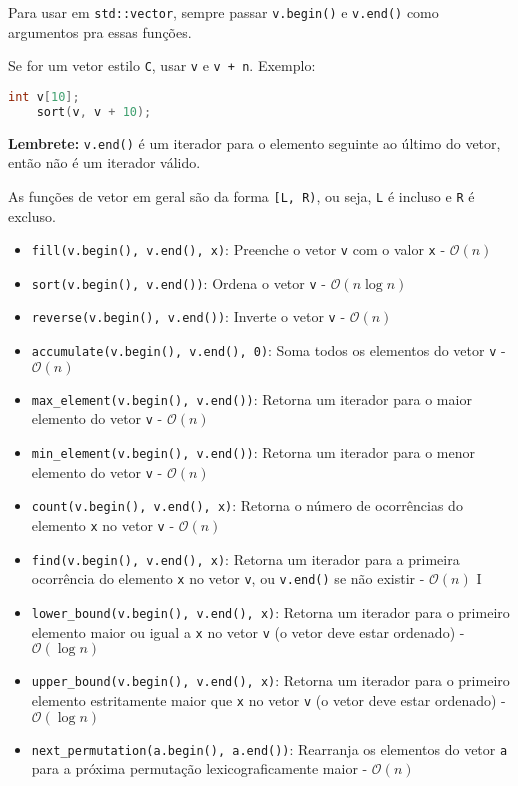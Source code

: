 \documentclass[10pt, a4paper, oneside]{book}
\begin{document}
Para usar em \texttt{std::vector}, sempre passar \texttt{v.begin()} e \texttt{v.end()} como argumentos pra essas funções.

Se for um vetor estilo \texttt{C}, usar \texttt{v} e \texttt{v + n}. 
Exemplo:
\begin{lstlisting}[language=C++]
    int v[10];
    sort(v, v + 10);
\end{lstlisting}

\textbf{Lembrete:} \texttt{v.end()} é um iterador para o elemento seguinte ao último do vetor, então não é um iterador válido.

As funções de vetor em geral são da forma \texttt{[L, R)}, ou seja, \texttt{L} é incluso e \texttt{R} é excluso.

\begin{itemize}
    \item \texttt{fill(v.begin(), v.end(), x)}: Preenche o vetor \texttt{v} com o valor \texttt{x} - $\mathcal{O}(n)$
    \item \texttt{sort(v.begin(), v.end())}: Ordena o vetor \texttt{v} - $\mathcal{O}(n \log n)$
    \item \texttt{reverse(v.begin(), v.end())}: Inverte o vetor \texttt{v} - $\mathcal{O}(n)$
    \item \texttt{accumulate(v.begin(), v.end(), 0)}: Soma todos os elementos do vetor \texttt{v} - $\mathcal{O}(n)$
    \item \texttt{max\_element(v.begin(), v.end())}: Retorna um iterador para o maior elemento do vetor \texttt{v} - $\mathcal{O}(n)$
    \item \texttt{min\_element(v.begin(), v.end())}: Retorna um iterador para o menor elemento do vetor \texttt{v} - $\mathcal{O}(n)$
    \item \texttt{count(v.begin(), v.end(), x)}: Retorna o número de ocorrências do elemento \texttt{x} no vetor \texttt{v} - $\mathcal{O}(n)$
    \item \texttt{find(v.begin(), v.end(), x)}: Retorna um iterador para a primeira ocorrência do elemento \texttt{x} no vetor \texttt{v}, ou \texttt{v.end()} se não existir - $\mathcal{O}(n)$
    I\item \texttt{lower\_bound(v.begin(), v.end(), x)}: Retorna um iterador para o primeiro elemento maior ou igual a \texttt{x} no vetor \texttt{v} (o vetor deve estar ordenado) - $\mathcal{O}(\log n)$
    \item \texttt{upper\_bound(v.begin(), v.end(), x)}: Retorna um iterador para o primeiro elemento estritamente maior que \texttt{x} no vetor \texttt{v} (o vetor deve estar ordenado) - $\mathcal{O}(\log n)$
    \item \texttt{next\_permutation(a.begin(), a.end())}: Rearranja os elementos do vetor \texttt{a} para a próxima permutação lexicograficamente maior - $\mathcal{O}(n)$
\end{itemize}
\end{document}
